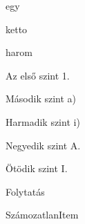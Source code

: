 \documentclass{article}
\begin{document}
\listoffigures
\listoftables
\begin{enumerate}
\begin{itemize*}[label=\textbullet,%
itemjoin*={\hspace{0.1em} és }]
\item egy
\item ketto
\item harom	
\end{itemize*}
\end{enumerate}
\begin{mynested}
    \item Az első szint 1.
    \begin{mynested}
        \item Második szint a)
        \begin{mynested}
            \item Harmadik szint i)
            \begin{mynested}
                \item Negyedik szint A.
                \begin{mynested}
                    \item Ötödik szint I.
                \end{mynested}
            \end{mynested}
        \end{mynested}
    \end{mynested}
\end{mynested}
\hulipsum [1]
\begin{mynested}[resume, label=\roman*,ref=(\roman*)]
\item Folytatás
\begin{mynested}[label=\roman*,ref=(\roman*)]
\item[] SzámozatlanItem
\end{mynested}
\end{mynested}
\begin{description}[style=sameline]
    \item[] \hulipsum[1]
    \item[slanted] \hulipsum[1]
    \item[hosszu cimke] \hulipsum[1]
\end{description}
\end{document}
